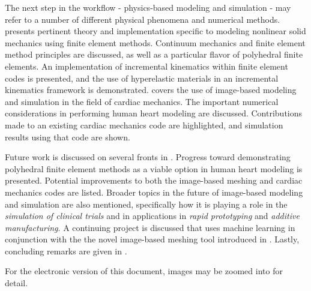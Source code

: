The next step in the workflow - physics-based modeling and simulation - may refer to a number of different physical phenomena and numerical methods.  presents pertinent theory and implementation specific to modeling nonlinear solid mechanics using finite element methods. Continuum mechanics and finite element method principles are discussed, as well as a particular flavor of polyhedral finite elements. An implementation of incremental kinematics within finite element codes is presented, and the use of hyperelastic materials in an incremental kinematics framework is demonstrated.  covers the use of image-based modeling and simulation in the field of cardiac mechanics. The important numerical considerations in performing human heart modeling are discussed. Contributions made to an existing cardiac mechanics code are highlighted, and simulation results using that code are shown.

Future work is discussed on several fronts in . Progress toward demonstrating polyhedral finite element methods as a viable option in human heart modeling is presented. Potential improvements to both the image-based meshing and cardiac mechanics codes are listed. Broader topics in the future of image-based modeling and simulation are also mentioned, specifically how it is playing a role in the \textit{simulation of clinical trials} and in applications in \textit{rapid prototyping} and \textit{additive manufacturing}. A continuing project is discussed that uses machine learning in conjunction with the the novel image-based meshing tool introduced in . Lastly, concluding remarks are given in .

For the electronic version of this document, images may be zoomed into for detail.
